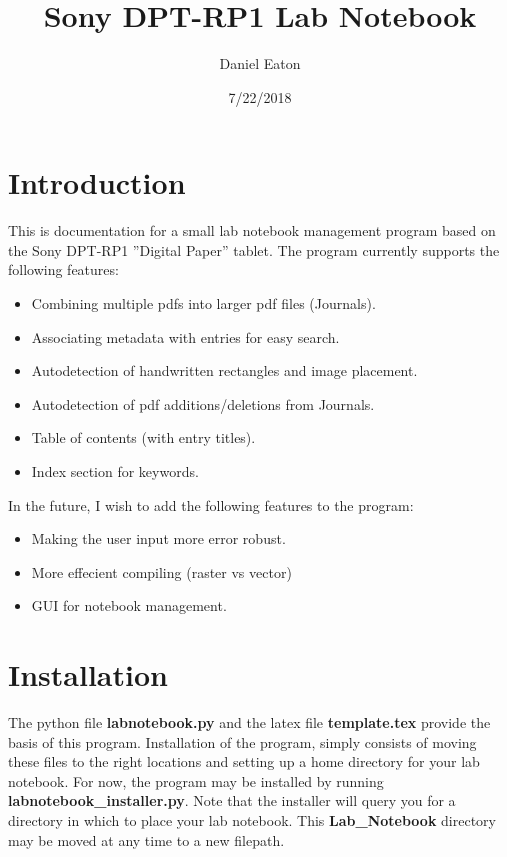 \documentclass{article}
\title{Sony DPT-RP1 Lab Notebook}
\author{Daniel Eaton}
\date{7/22/2018}
\begin{document}
\maketitle

\section{Introduction}

This is documentation for a small lab notebook management program based on the Sony DPT-RP1 ''Digital Paper'' tablet. The program currently supports the following features:
\begin{itemize}
    \item Combining multiple pdfs into larger pdf files (Journals).
    \item Associating metadata with entries for easy search.
    \item Autodetection of handwritten rectangles and image placement.
    \item Autodetection of pdf additions/deletions from Journals.
    \item Table of contents (with entry titles).
    \item Index section for keywords.
\end{itemize}

\noindent In the future, I wish to add the following features to the program:
\begin{itemize}
    \item Making the user input more error robust.
    \item More effecient compiling (raster vs vector)
    \item GUI for notebook management.
\end{itemize}

\section{Installation}
The python file \textbf{labnotebook.py} and the latex file \textbf{template.tex} provide the basis of this program. Installation of the program, simply consists of moving these files to the right locations and setting up a home directory for your lab notebook. For now, the program may be installed by running \textbf{labnotebook\_installer.py}. Note that the installer will query you for a directory in which to place your lab notebook. This \textbf{Lab\_Notebook} directory may be moved at any time to a new filepath.\\
\end{document}
